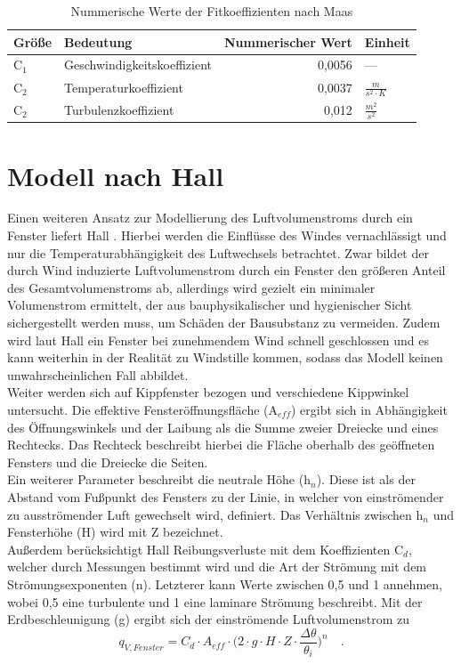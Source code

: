 \begin{table}[H] \centering
\begin{tabular}{|l|l|r|l|}
\hline
\rowcolor[HTML]{C0C0C0} 
Größe & Bedeutung & \multicolumn{1}{l|}{\cellcolor[HTML]{C0C0C0}Nummerischer Wert} & Einheit \\ \hline
C\(_1\) & Geschwindigkeitskoeffizient & 0,0056 & --- \\ \hline
\rowcolor[HTML]{EFEFEF} 
C\(_2\) & Temperaturkoeffizient & 0,0037 & \(\frac{m}{s^2 \cdot K}\) \\ \hline
C\(_2\) & Turbulenzkoeffizient & 0,012 & \(\frac{m^2}{s^2}\) \\ \hline
\end{tabular}
\caption{Nummerische Werte der Fitkoeffizienten nach Maas \cite{Maas.1995}}
\label{tab: Tabelle3313}
\end{table}

\section*{Modell nach Hall}
Einen weiteren Ansatz zur Modellierung des Luftvolumenstroms durch ein Fenster liefert Hall \cite{Hall.2004}.
Hierbei werden die Einflüsse des Windes vernachlässigt und nur die Temperaturabhängigkeit des Luftwechsels betrachtet.
Zwar bildet der durch Wind induzierte Luftvolumenstrom durch ein Fenster den größeren Anteil des Gesamtvolumenstroms ab, allerdings wird gezielt ein minimaler Volumenstrom ermittelt, der aus bauphysikalischer und hygienischer Sicht sichergestellt werden muss, um Schäden der Bausubstanz zu vermeiden.
Zudem wird laut Hall ein Fenster bei zunehmendem Wind schnell geschlossen und es kann weiterhin in der Realität zu Windstille kommen, sodass das Modell keinen unwahrscheinlichen Fall abbildet.\\
Weiter werden sich auf Kippfenster bezogen und verschiedene Kippwinkel untersucht.
Die effektive Fensteröffnungsfläche (A\(_{eff}\)) ergibt sich in Abhängigkeit des Öffnungswinkels und der Laibung als die Summe zweier Dreiecke und eines Rechtecks.
Das Rechteck beschreibt hierbei die Fläche oberhalb des geöffneten Fensters und die Dreiecke die Seiten.\\
Ein weiterer Parameter beschreibt die neutrale Höhe (h\(_n\)). 
Diese ist als der Abstand vom Fußpunkt des Fensters zu der Linie, in welcher von einströmender zu ausströmender Luft gewechselt wird, definiert.
Das Verhältnis zwischen h\(_n\) und Fensterhöhe (H) wird mit Z bezeichnet.\\
Außerdem berücksichtigt Hall Reibungsverluste mit dem Koeffizienten C\(_d\), welcher durch Messungen bestimmt wird und die Art der Strömung mit dem Strömungsexponenten (n). 
Letzterer kann Werte zwischen 0,5 und 1 annehmen, wobei 0,5 eine turbulente und 1 eine laminare Strömung beschreibt.
Mit der Erdbeschleunigung (g) ergibt sich der einströmende Luftvolumenstrom zu
\begin{equation}
\label{eq:Gleichung3312}
q_{V, Fenster} = C_d \cdot A_{eff} \cdot \Biggl( 2 \cdot g \cdot H \cdot Z \cdot \frac{\Delta\theta}{\theta_i}\Biggr)^n \quad \text{.}
\end{equation}

